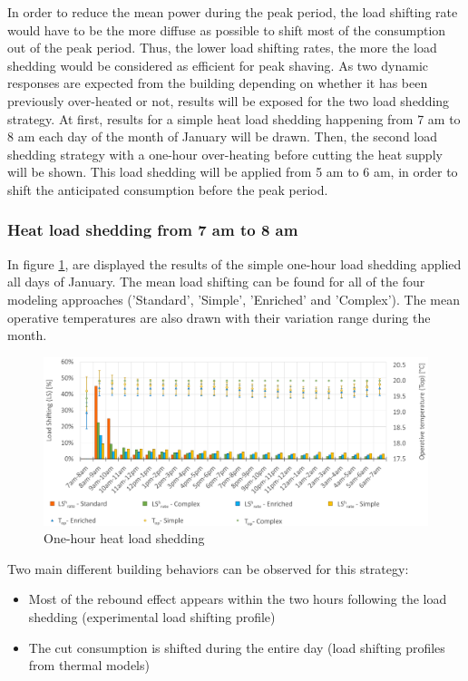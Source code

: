 \documentclass[buildings,article,submit,moreauthors,pdftex,10pt,a4paper]{mdpi}
\theoremstyle{mdpi}
\newcounter{ex}
\newcounter{re}
\theoremstyle{mdpidefinition}
\begin{document}
In order to reduce the mean power during the peak period, the load shifting rate would have to be the more diffuse as possible to shift most of the consumption out of the peak period. Thus, the lower load shifting rates, the more the load shedding would be considered as efficient for peak shaving. As two dynamic responses are expected from the building depending on whether it has been previously over-heated or not, results will be exposed for the two load shedding strategy. At first, results for a simple heat load shedding happening from 7 am to 8 am each day of the month of January will be drawn. Then, the second load shedding strategy with a one-hour over-heating before cutting the heat supply will be shown. This load shedding will be applied from 5 am to 6 am, in order to shift the anticipated consumption before the peak period.

\subsubsection{Heat load shedding from 7 am to 8 am}
In figure \ref{simple-load-shedding-res}, are displayed the results of the simple one-hour load shedding applied all days of January. The mean load shifting can be found for all of the four modeling approaches ('Standard', 'Simple', 'Enriched' and 'Complex'). The mean operative temperatures are also drawn with their variation range during the month. 
\begin{figure}[H]
	\centering
	\includegraphics[width=15cm]{simple_ls.png}
  	\caption{One-hour heat load shedding}
    \label{simple-load-shedding-res}
\end{figure}
      
Two main different building behaviors can be observed for this strategy:
\begin{itemize}[leftmargin=*,labelsep=4mm]
	\item Most of the rebound effect appears within the two hours following the load shedding (experimental load shifting profile)
	\item The cut consumption is shifted during the entire day (load shifting profiles from thermal models)
\end{itemize}
\end{document}
